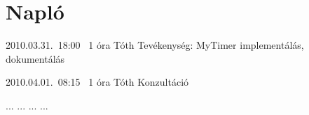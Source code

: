 %
\section{Napló}

\begin{naplo}

\bejegyzes
{2010.03.31.~18:00~}
{1 óra}
{Tóth}
{Tevékenység: MyTimer implementálás, dokumentálás}

\bejegyzes
{2010.04.01.~08:15~} %
{1 óra} %
{Tóth} %
{Konzultáció} %

\bejegyzes
{...}
{...}
{...}
{...}


\end{naplo}

